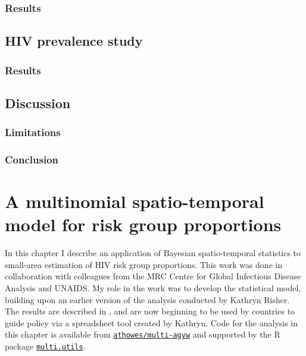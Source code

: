 \documentclass[a4paper, nobind]{templates/ociamthesis}
\begin{document}
\hypertarget{results}{%
\subsection{Results}\label{results}}

\hypertarget{hiv-prevalence-study}{%
\section{HIV prevalence study}\label{hiv-prevalence-study}}

\hypertarget{results-1}{%
\subsection{Results}\label{results-1}}

\hypertarget{discussion}{%
\section{Discussion}\label{discussion}}

\hypertarget{limitations}{%
\subsection{Limitations}\label{limitations}}

\hypertarget{conclusion}{%
\subsection{Conclusion}\label{conclusion}}

\hypertarget{multi-agyw}{%
\chapter{A multinomial spatio-temporal model for risk group proportions}\label{multi-agyw}}

\adjustmtc
{}

In this chapter I describe an application of Bayesian spatio-temporal statistics to small-area estimation of HIV risk group proportions.
This work was done in collaboration with colleagues from the MRC Centre for Global Infectious Disease Analysis and UNAIDS.
My role in the work was to develop the statistical model, building upon an earlier version of the analysis conducted by Kathryn Risher.
The results are described in \textcite{howes2023spatio}, and are now beginning to be used by countries to guide policy via a spreadsheet tool created by Kathryn.
Code for the analysis in this chapter is available from \href{https://github.com/athowes/multi-agyw}{\texttt{athowes/multi-agyw}} and supported by the R package \href{https://athowes.github.io/multi.utils}{\texttt{multi.utils}}.
\end{document}
